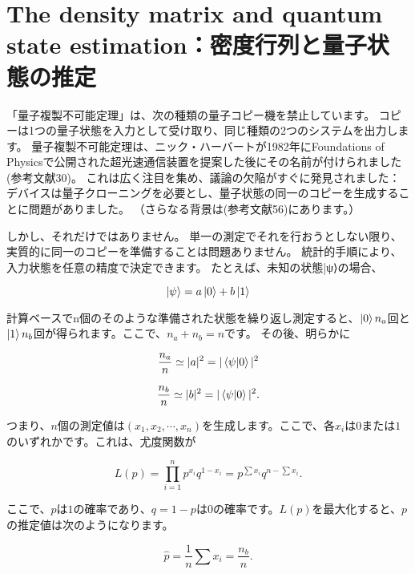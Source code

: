 \section{The density matrix and quantum state estimation：密度行列と量子状態の推定}

「量子複製不可能定理」は、次の種類の量子コピー機を禁止しています。
コピーは1つの量子状態を入力として受け取り、同じ種類の2つのシステムを出力します。 量子複製不可能定理は、ニック・ハーバートが1982年にFoundations of Physicsで公開された超光速通信装置を提案した後にその名前が付けられました(参考文献30)。 これは広く注目を集め、議論の欠陥がすぐに発見されました：デバイスは量子クローニングを必要とし、量子状態の同一のコピーを生成することに問題がありました。 （さらなる背景は(参考文献56)にあります。）

しかし、それだけではありません。 単一の測定でそれを行おうとしない限り、実質的に同一のコピーを準備することは問題ありません。 統計的手順により、入力状態を任意の精度で決定できます。 たとえば、未知の状態|ψ⟩の場合、

\begin{equation}
\label{234}
\ket{\psi} = a \ket{0} + b \ket{1}
\end{equation}

計算ベースでn個のそのような準備された状態を繰り返し測定すると、$\ket{0} n_a$回と$\ket{1} n_b$回が得られます。ここで、$n_a + n_b = n$です。 その後、明らかに

\begin{equation}
\label{235}
\frac{n_a}{n} 
\simeq
|a|^2
=
| \braket{\psi | 0} |^2
\end{equation}


\begin{equation}
\label{236}
\frac{n_b}{n} 
\simeq
|b|^2
=
| \braket{\psi | 0} |^2.
\end{equation}

つまり、$n$個の測定値は$(x_1, x_2, \cdots, x_n)$を生成します。ここで、各$x_i$は$0$または$1$のいずれかです。これは、尤度関数が

\begin{equation}
\label{237}
L(p) 
=
\prod_{i=1}^n p^{x_i} q^{1-x_i}
=
p^{\sum x_i} q^{n - \sum x_i} .
\end{equation}

ここで、$p$は$1$の確率であり、$q = 1 − p$は$0$の確率です。$L(p)$を最大化すると、$p$の推定値は次のようになります。

\begin{equation}
\label{237}
\hat{p}
=
\frac{1}{n} \sum x_i
=
\frac{n_b}{n} .
\end{equation}

